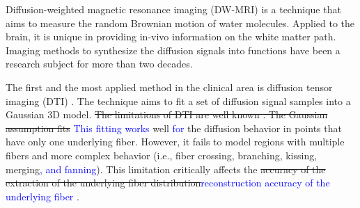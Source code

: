 \documentclass[twoside,twocolumn,10pt]{article}
\begin{document}
\copyrightspace

Diffusion-weighted magnetic resonance imaging (DW-MRI) is a technique that aims to measure the random Brownian motion of water molecules. Applied to the brain, it is unique in providing in-vivo information on the white matter path. Imaging methods to synthesize the diffusion signals into functions have been a research subject for more than two decades.

The first and the most applied method in the clinical area is diffusion tensor imaging (DTI) \cite{Basser1994}. The technique aims to fit a set of diffusion signal samples into a Gaussian 3D model.
\sout{The limitations of DTI are well known \cite{descoteaux2015,SCHILLING2019194}. The Gaussian assumption fits} \textcolor{blue}{This fitting works}  well \textcolor{blue}{for} the diffusion behavior in points that have only one underlying fiber. However, it fails to model regions with multiple fibers and more complex behavior (i.e., fiber crossing, branching, kissing, merging\textcolor{blue}{, and fanning}). This limitation critically affects the \sout{accuracy of the extraction of the underlying fiber distribution}\textcolor{blue}{reconstruction accuracy of the underlying fiber \cite{descoteaux2015,SCHILLING2019194}}.

\end{document}
